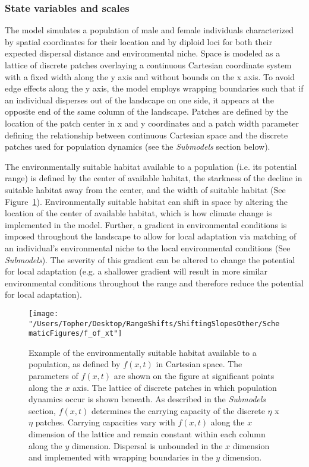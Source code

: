 \documentclass[11pt, oneside]{article}
\begin{document}
\subsubsection{State variables and scales}
The model simulates a population of male and female individuals characterized by spatial coordinates for their location and by diploid loci for both their expected dispersal distance and environmental niche. Space is modeled as a lattice of discrete patches overlaying a continuous Cartesian coordinate system with a fixed width along the y axis and without bounds on the x axis. To avoid edge effects along the y axis, the model employs wrapping boundaries such that if an individual disperses out of the landscape on one side, it appears at the opposite end of the same column of the landscape. Patches are defined by the location of the patch center in x and y coordinates and a patch width parameter defining the relationship between continuous Cartesian space and the discrete patches used for population dynamics (see the \textit{Submodels} section below). 

The environmentally suitable habitat available to a population (i.e. its potential range) is defined by the center of available habitat, the starkness of the decline in suitable habitat away from the center, and the width of suitable habitat (See Figure~\ref{fig:EnvFunction}). Environmentally suitable habitat can shift in space by altering the location of the center of available habitat, which is how climate change is implemented in the model. Further, a gradient in environmental conditions is imposed throughout the landscape to allow for local adaptation via matching of an individual's environmental niche to the local environmental conditions (See \textit{Submodels}). The severity of this gradient can be altered to change the potential for local adaptation (e.g. a shallower gradient will result in more similar environmental conditions throughout the range and therefore reduce the potential for local adaptation).

\begin{figure}
\centering
\texttt{[image: "/Users/Topher/Desktop/RangeShifts/ShiftingSlopesOther/SchematicFigures/f\_of\_xt"]}
\vspace{-5mm}
\caption[LoF entry]{Example of the environmentally suitable habitat available to a population, as defined by $f(x,t)$ in Cartesian space. The parameters of $f(x,t)$ are shown on the figure at significant points along the $x$ axis. The lattice of discrete patches in which population dynamics occur is shown beneath. As described in the \textit{Submodels} section, $f(x,t)$ determines the carrying capacity of the discrete $\eta$ x $\eta$ patches. Carrying capacities vary with $f(x,t)$ along the $x$ dimension of the lattice and remain constant within each column along the $y$ dimension. Dispersal is unbounded in the $x$ dimension and implemented with wrapping boundaries in the $y$ dimension.}
\label{fig:EnvFunction}
\end{figure}
\end{document}
